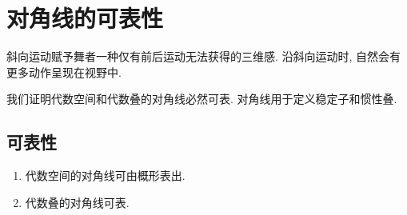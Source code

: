 \section{对角线的可表性}\label{src:4.2-section}
\begin{epigraph}
斜向运动赋予舞者一种仅有前后运动无法获得的三维感. 沿斜向运动时, 自然会有更多动作呈现在视野中.
\end{epigraph}
我们证明代数空间和代数叠的对角线必然可表. 对角线用于定义稳定子和惯性叠.
\subsection{可表性}\label{src:4.2.1-subsection}
\begin{theorem}[对角线的可表性]\label{src:4.2.1}
\begin{enumerate}[(1)]
\item 代数空间的对角线可由概形表出.
\item 代数叠的对角线可表.
\end{enumerate}
\end{theorem}
